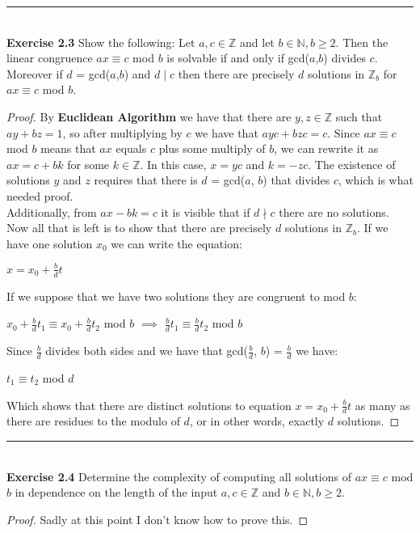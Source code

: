 \documentclass{article}
\begin{document}
\noindent\rule{12cm}{0.4pt}\\
\noindent \textbf{Exercise 2.3} Show the following:
Let $a, c \in \mathbb{Z}$ and let $b \in \mathbb{N}, b \geq 2$. Then the linear congruence $ax \equiv c$ mod $b$ is solvable if and only if gcd($a$,$b$) divides $c$. Moreover if $d$ = gcd($a$,$b$) and $d \mid c$ then there are precisely $d$ solutions in $\mathbb{Z}_{b}$ for $ax \equiv c$ mod $b$.
\begin{proof}
By \textbf{Euclidean Algorithm} we have that there are $y, z \in \mathbb{Z}$ such that $ay + bz = 1$, so after multiplying by $c$ we have that $ayc + bzc = c$. Since $ax \equiv c$ mod $b$ means that $ax$ equals $c$ plus some multiply of $b$, we can rewrite it as $ax = c + bk$ for some $k \in  \mathbb{Z}$. In this case, $x = yc$ and $k = -zc$. The existence of solutions $y$ and $z$ requires that there is $d$ = gcd($a$, $b$) that divides $c$, which is what needed proof. \\
Additionally, from $ax - bk = c$ it is visible that if $d \nmid c$ there are no solutions. Now all that is left is to show that there are precisely $d$ solutions in $\mathbb{Z}_b$. If we have one solution $x_0$ we can write the equation:
\begin{center}
$x = x_0 + \frac{b}{d}t$
\end{center}
If we suppose that we have two solutions they are congruent to mod $b$:
\begin{center}
$x_0 + \frac{b}{d}t_1 \equiv x_0 + \frac{b}{d}t_2$ mod $b$ $\implies$ $\frac{b}{d}t_1 \equiv \frac{b}{d}t_2$ mod $b$
\end{center}
Since $\frac{b}{d}$ divides both sides and we have that gcd($\frac{b}{d}$, $b$) = $\frac{b}{d}$ we have:
\begin{center}
	$t_1 \equiv t_2$ mod $d$
\end{center}
Which shows that there are distinct solutions to equation $x = x_0 + \frac{b}{d}t$ as many as there are residues to the modulo of $d$, or in other words, exactly $d$ solutions.
\end{proof}



\noindent\rule{12cm}{0.4pt}\\
\noindent \textbf{Exercise 2.4} Determine the complexity of computing all solutions of $ax \equiv c$ mod $b$ in dependence on the length of the input $a, c \in \mathbb{Z}$ and $b \in \mathbb{N}, b \geq 2$.
\begin{proof}
Sadly at this point I don't know how to prove this.
\end{proof}
\end{document}
